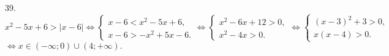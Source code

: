 39. $x^2-5x+6>|x-6|\Leftrightarrow \begin{cases}x-6<x^2-5x+6,\\ x-6>-x^2+5x-6.\end{cases}
\Leftrightarrow \begin{cases}x^2-6x+12>0,\\ x^2-4x>0.\end{cases}
\Leftrightarrow \begin{cases}(x-3)^2+3>0,\\ x(x-4)>0.\end{cases}$\\$\Leftrightarrow x\in (-\infty;0)\cup(4;+\infty).$\\
